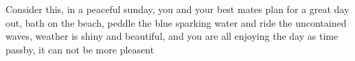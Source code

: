 Consider this, in a peaceful sunday, you and your best mates plan for a great day out, bath on the beach, peddle the blue sparking water and ride the uncontained waves, weather is shiny and beautiful,  and you are all enjoying the day as time passby, it can not be more pleasent 